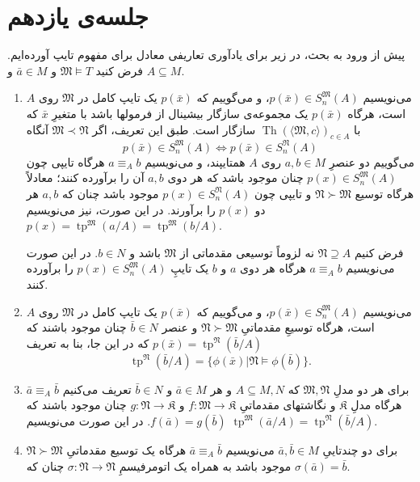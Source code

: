 \documentclass[12pt,a4paper]{report}
\theoremstyle{colorhead}
\DeclareMathOperator{\Th}{Th}
\DeclareMathOperator{\tp}{tp}
\begin{document}
\section{جلسه‌ی یازدهم}
پیش از ورود به بحث، در زیر برای یادآوری تعاریفی معادل برای مفهوم تایپ آورده‌ایم.
فرض کنید
$\mathfrak{M}\models T$
و
$\bar{a}\in M$
و
$A\subseteq M$.
\begin{enumerate}
\item 
می‌نویسیم
$p(\bar{x})\in S^\mathfrak{M}_n(A)$،
و می‌گوییم که
$p(\bar{x})$
یک تایپ کامل در
$\mathfrak{M}$
روی
$A$
است، هرگاه 
$p(\bar{x})$
یک مجموعه‌ی سازگار بیشینال از فرمولها باشد با متغیرِ
$\bar{x}$
که با
$\Th(\langle \mathfrak{M},c\rangle)_{c\in A}$
سازگار است. طبق این تعریف،‌ اگر
$\mathfrak{M}\prec \mathfrak{N}$
آنگاه 
\[
p(\bar{x})\in S^\mathfrak{M}_n(A)\Leftrightarrow p(\bar{x})\in S^\mathfrak{N}_n(A)
\]
می‌گوییم دو عنصرِ
$a,b\in M$
روی
$A$
همتایپند، و می‌نویسیم
$a\equiv_{A}b$
هرگاه
تایپی چون
$p(x)\in S^\mathfrak{M}_n(A)$
چنان موجود باشد که هر دوی
$a,b$
آن را برآورده کنند؛ معادلاً هرگاه
توسیع
$\mathfrak{N}\succ \mathfrak{M}$
و تایپی چون
$p(x)\in S^\mathfrak{N}_n(A)$
موجود باشد چنان که
$a,b$
هر دو 
$p(x)$
را برآورند. در این صورت،‌ نیز می‌نویسیم
$p(x)=\tp^\mathfrak{M}(a/A)=\tp^\mathfrak{M}(b/A)$.
\par 
فرض کنیم
$\mathfrak{N}\supseteq A$
نه لزوماً
توسیعی مقدماتی از
$\mathfrak{M}$
باشد و 
$b\in  N$.
در این صورت می‌نویسیم
$a\equiv_A b$
هرگاه هر دوی 
$a$
و
$b$
یک تایپِ
$p(x)\in S^\mathfrak{M}_n(A)$
را برآورده کنند. 
\item 
می‌نویسیم
$p(\bar{x})\in S^\mathfrak{M}_n(A)$،
و می‌گوییم که
$p(\bar{x})$
یک تایپ کامل در
$\mathfrak{M}$
روی
$A$
است، هرگاه توسیعِ مقدماتیِ
$\mathfrak{N}\succ \mathfrak{M}$
و عنصر
$\bar{b}\in N$
چنان موجود باشند که
$p(\bar{x})=\tp^\mathfrak{N}(\bar{b}/A)$
که در این جا، بنا به تعریف
\[
\tp^\mathfrak{N}(\bar{b}/A)=\{\phi(\bar{x})|\mathfrak{N}\models \phi(\bar{b})\}.
\]
\item 
برای هر دو مدلِ
$\mathfrak{M},\mathfrak{N}$
که 
$A\subseteq M,N$
و هر
$\bar{a}\in M$
و
$\bar{b}\in N$
تعریف می‌کنیم
$\bar{a}\equiv_A \bar{b}$
هرگاه مدلِ
$\mathfrak{K}$
و نگاشتهای مقدماتیِ
$f:\mathfrak{M}\to \mathfrak{K}$
و
$g:\mathfrak{N}\to \mathfrak{K}$
چنان موجود باشند که 
$f(\bar{a})=g(\bar{b})$.
در این صورت می‌نویسیم
$\tp^\mathfrak{M}(\bar{a}/A)=\tp^\mathfrak{N}(\bar{b}/A)$.
\item 
برای دو چندتاییِ
$\bar{a},\bar{b}\in M$
می‌نویسیم 
$\bar{a}\equiv_A\bar{b}$
هرگاه یک توسیع مقدماتیِ
$\mathfrak{N}\succ \mathfrak{M}$
موجود باشد به همراه یک اتومرفیسمِ
$\sigma:\mathfrak{N}\to \mathfrak{N}$
چنان که
$\sigma(\bar{a})=\bar{b}$.
\end{enumerate}
\end{document}
